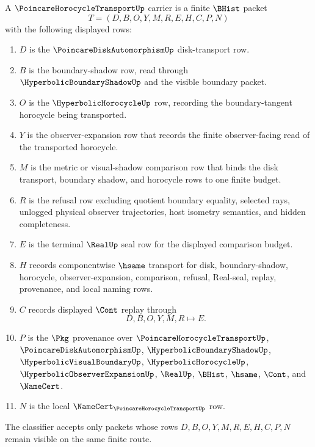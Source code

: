 \begin{definition}
\label{def:poincare-horocycle-transport-carrier}
A $\PoincareHorocycleTransportUp$ carrier is a finite $\BHist$ packet
$$
T=(D,B,O,Y,M,R,E,H,C,P,N)
$$
with the following displayed rows:
\begin{enumerate}
\item $D$ is the $\PoincareDiskAutomorphismUp$ disk-transport row.
\item $B$ is the boundary-shadow row, read through $\HyperbolicBoundaryShadowUp$ and the visible boundary packet.
\item $O$ is the $\HyperbolicHorocycleUp$ row, recording the boundary-tangent horocycle being transported.
\item $Y$ is the observer-expansion row that records the finite observer-facing read of the transported horocycle.
\item $M$ is the metric or visual-shadow comparison row that binds the disk transport, boundary shadow, and horocycle rows to one finite budget.
\item $R$ is the refusal row excluding quotient boundary equality, selected rays, unlogged physical observer trajectories, host isometry semantics, and hidden completeness.
\item $E$ is the terminal $\RealUp$ seal row for the displayed comparison budget.
\item $H$ records componentwise $\hsame$ transport for disk, boundary-shadow, horocycle, observer-expansion, comparison, refusal, Real-seal, replay, provenance, and local naming rows.
\item $C$ records displayed $\Cont$ replay through
$$
D,B,O,Y,M,R \longmapsto E .
$$
\item $P$ is the $\Pkg$ provenance over $\PoincareHorocycleTransportUp$, $\PoincareDiskAutomorphismUp$, $\HyperbolicBoundaryShadowUp$, $\HyperbolicVisualBoundaryUp$, $\HyperbolicHorocycleUp$, $\HyperbolicObserverExpansionUp$, $\RealUp$, $\BHist$, $\hsame$, $\Cont$, and $\NameCert$.
\item $N$ is the local $\NameCert_{\PoincareHorocycleTransportUp}$ row.
\end{enumerate}
The classifier accepts only packets whose rows $D,B,O,Y,M,R,E,H,C,P,N$ remain visible on the same finite route.
\end{definition}

